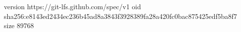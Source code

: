 version https://git-lfs.github.com/spec/v1
oid sha256:e8143ed2434ec236b45ad8a3843f3928389fa28a420fc0bac875425edf5ba8f7
size 89768
